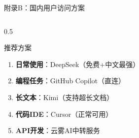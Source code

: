 \documentclass[aspectratio=169,11pt]{beamer}
\begin{document}
\begin{frame}{附录B：国内用户访问方案}
\begin{columns}
\begin{column}{0.5\textwidth}
            \vspace{0.3cm}
            \begin{alertblock}{推荐方案}
                \begin{enumerate}
                    \item \textbf{日常使用}：DeepSeek（免费+中文最强）
                    \item \textbf{编程任务}：GitHub Copilot（直连）
                    \item \textbf{长文本}：Kimi（支持超长文档）
                    \item \textbf{代码IDE}：Cursor（正常可用）
                    \item \textbf{API开发}：云雾AI中转服务
                \end{enumerate}
            \end{alertblock}
        \end{column}
    \end{columns}
\end{frame}
\end{document}
